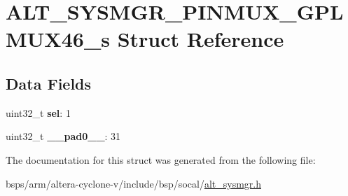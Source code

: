 \hypertarget{structALT__SYSMGR__PINMUX__GPLMUX46__s}{}\section{A\+L\+T\+\_\+\+S\+Y\+S\+M\+G\+R\+\_\+\+P\+I\+N\+M\+U\+X\+\_\+\+G\+P\+L\+M\+U\+X46\+\_\+s Struct Reference}
\label{structALT__SYSMGR__PINMUX__GPLMUX46__s}
\subsection*{Data Fields}
\begin{DoxyCompactItemize}
\item 
\mbox{\label{structALT__SYSMGR__PINMUX__GPLMUX46__s_abb5a5279ce452ac31aacf65a7847c800}} 
uint32\+\_\+t {\bfseries sel}\+: 1
\item 
\mbox{\label{structALT__SYSMGR__PINMUX__GPLMUX46__s_a3304366a68d7280cf147a7310864e783}} 
uint32\+\_\+t {\bfseries \+\_\+\+\_\+pad0\+\_\+\+\_\+}\+: 31
\end{DoxyCompactItemize}


The documentation for this struct was generated from the following file\+:\begin{DoxyCompactItemize}
\item 
bsps/arm/altera-\/cyclone-\/v/include/bsp/socal/\mbox{\hyperlink{alt__sysmgr_8h}{alt\+\_\+sysmgr.\+h}}\end{DoxyCompactItemize}
